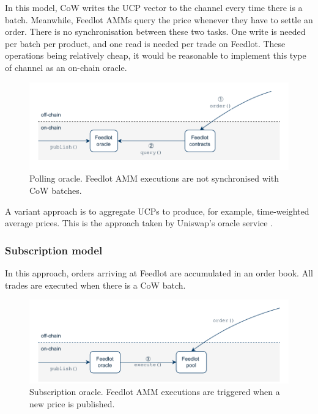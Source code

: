 \documentclass[a4paper,10pt]{article}
\theoremstyle{remark}
\begin{document}
In this model, CoW writes the UCP vector to the channel every time there is a batch. Meanwhile, Feedlot AMMs query the price whenever they have to settle an order.
%
There is no synchronisation between these two tasks.
%
One write is needed per batch per product, and one read is needed per trade on Feedlot.
%
These operations being relatively cheap, it would be reasonable to implement this type of channel as an on-chain oracle.
%
\begin{figure}
  \begin{center}
    \vspace{1ex}
    \includegraphics[width=\textwidth * \real{0.8}]{diagrams/poll.pdf}
    \caption{Polling oracle. Feedlot AMM executions are not synchronised with CoW batches.}
  \end{center}
\end{figure}
%
A variant approach is to aggregate UCPs to produce, for example, time-weighted average prices. This is the approach taken by Uniswap's oracle service \cite{adams2020uniswap}.

\subsubsection{Subscription model}

In this approach, orders arriving at Feedlot are accumulated in an order book.
%
All trades are executed when there is a CoW batch.
\begin{figure}
  \begin{center}
    \includegraphics{diagrams/sub.pdf}
    \caption{Subscription oracle. Feedlot AMM executions are triggered when a new price is published.}
  \end{center}
\end{figure}
\end{document}
